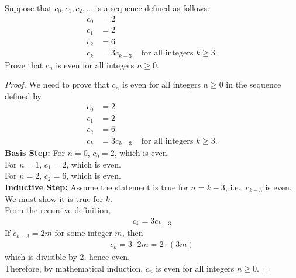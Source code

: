 \documentclass[name=Ojas\ Chaturvedi, emailid=oj.chaturvedi.2024, course=Capstone:\ Discrete\ Math, num=9, deadline={November\ 17,\ 2023}]{homework}
\begin{document}
    Suppose that $c_0, c_1, c_2, \ldots$ is a sequence defined as follows:
    \begin{align*}
        c_0 &= 2 \\
        c_1 &= 2 \\
        c_2 &= 6 \\
        c_k &= 3c_{k-3} & \text{ for all integers } k \geq 3.
    \end{align*}
    Prove that $c_n$ is even for all integers $n \geq 0$.
\begin{proof}
    We need to prove that $c_n$ is even for all integers $n \geq 0$ in the sequence defined by
    \begin{align*}
        c_0 &= 2 \\
        c_1 &= 2 \\
        c_2 &= 6 \\
        c_k &= 3c_{k-3} & \text{ for all integers } k \geq 3.
    \end{align*}
    \textbf{Basis Step:}
    For $n = 0$, $c_0 = 2$, which is even. \\
    For $n = 1$, $c_1 = 2$, which is even. \\
    For $n = 2$, $c_2 = 6$, which is even. \\
    \textbf{Inductive Step:}
    Assume the statement is true for $n = k-3$, i.e., $c_{k-3}$ is even. We must show it is true for $k$. \\
    From the recursive definition,
    \begin{align*}
        c_k = 3c_{k-3}
    \end{align*}
    If $c_{k-3} = 2m$ for some integer $m$, then
    \begin{align*}
        c_k = 3 \cdot 2m = 2 \cdot (3m)
    \end{align*}
    which is divisible by 2, hence even. \\
    Therefore, by mathematical induction, $c_n$ is even for all integers $n \geq 0$.
\end{proof}
\end{document}
